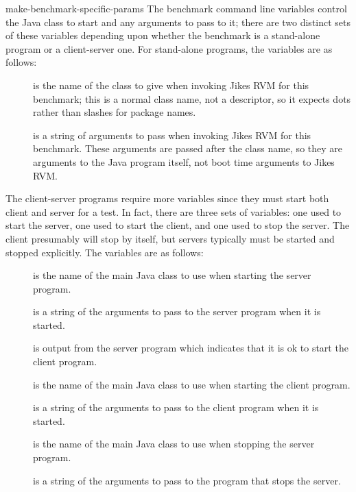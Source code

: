 \begin{description}
\begin{Label}{make-benchmark-specific-params}
 The benchmark command line variables control the Java class to start
and any arguments to pass to it; there are two distinct sets of these
variables depending upon whether the benchmark is a stand-alone program
or a client-server one.  For stand-alone programs, the variables are as
follows: 
\begin{description}
\item[] is the name of the class to give when invoking
Jikes RVM
for this benchmark; this is a normal class name, not a descriptor, so
it expects dots rather than slashes for package names.
\item[] is a string of arguments to pass when invoking
Jikes RVM
for this benchmark.  These arguments are passed after the class name,
so they are arguments to the Java program itself, not boot time
arguments to Jikes RVM.
\end{description}

 The client-server programs require more variables since they must
start both client and server for a test.  In fact, there are three
sets of variables: one used to start the server, one used to start the
client, and one used to stop the server.  The client presumably will
stop by itself, but servers typically must be started and stopped
explicitly.  The variables are as follows:
\begin{description}
\item[] is the name of the main Java class to use when
starting the server program.
\item[] is a string of the arguments to pass to the server
program when it is started.
\item[] is output from the server program which indicates that
it is ok to start the client program.
\item[] is the name of the main Java class to use when
starting the client program.
\item[] is a string of the arguments to pass to the client
program when it is started.
\item[] is the name of the main Java class to use when
stopping the server program.
\item[] is a string of the arguments to pass to the program
that stops the server.
\end{description}
\end{Label}


\end{description}

